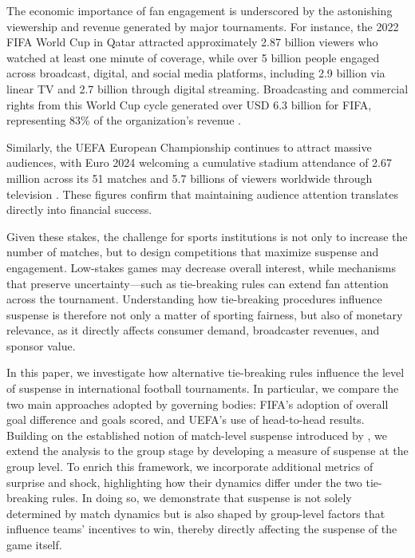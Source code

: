 \documentclass[11pt]{article}
\begin{document}
The economic importance of fan engagement is underscored by the astonishing viewership and revenue generated by major tournaments. For instance, the 2022 FIFA World Cup in Qatar attracted approximately 2.87 billion viewers who watched at least one minute of coverage, while over 5 billion people engaged across broadcast, digital, and social media platforms, 
including 2.9 billion via linear TV and 2.7 billion through digital streaming\citep{fifa2022engagement, fifa2022audience}. Broadcasting and commercial rights from this World Cup cycle generated over USD 6.3 billion for FIFA, representing 83\% of the organization's revenue \citep{fifa2022finance}. 

Similarly, the UEFA European Championship continues to attract massive audiences, with Euro 2024 welcoming a cumulative stadium attendance of 2.67 million across its 51 matches and 5.7 billions of viewers worldwide through television \citep{uefa2024numbers,uefa2024remember}. These figures confirm that maintaining audience attention translates directly into financial success.

Given these stakes, the challenge for sports institutions is not only to increase the number of matches, but to design competitions that maximize suspense and engagement. Low-stakes games may decrease overall interest, while mechanisms that preserve uncertainty—such as tie-breaking rules can extend fan attention across the tournament. Understanding how tie-breaking procedures influence suspense is therefore not only a matter of sporting fairness, but also of monetary relevance, as it directly affects consumer demand, broadcaster revenues, and sponsor value.

In this paper, we investigate how alternative tie-breaking rules influence the level of suspense in international football tournaments. In particular, we compare the two main approaches adopted by governing bodies: FIFA’s adoption of overall goal difference and goals scored, and UEFA’s use of head-to-head results. Building on the established notion of match-level suspense introduced by \citet{bizzozero2016importance}, we extend the analysis to the group stage by developing a measure of suspense at the group level. To enrich this framework, we incorporate additional metrics of surprise and shock, highlighting how their dynamics differ under the two tie-breaking rules. In doing so, we demonstrate that suspense is not solely determined by match dynamics but is also shaped by group-level factors that influence teams’ incentives to win, thereby directly affecting the suspense of the game itself.
\end{document}
